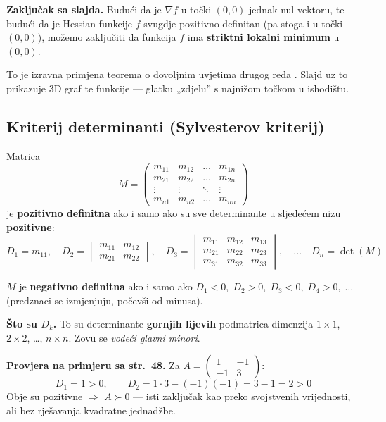 \textbf{Zaključak sa slajda.} Budući da je $\nabla f$ u točki $(0,0)$ jednak
nul-vektoru, te budući da je Hessian funkcije $f$ svugdje pozitivno definitan
(pa stoga i u točki $(0,0)$), možemo zaključiti da funkcija $f$ ima
\textbf{striktni lokalni minimum} u $(0,0)$.

To je izravna primjena teorema o dovoljnim uvjetima drugog reda .
Slajd uz to prikazuje 3D graf te funkcije --- glatku „zdjelu” s najnižom točkom
u ishodištu.

\subsection{Kriterij determinanti (Sylvesterov kriterij)}

\begin{teorem}
Matrica
\[
M = \begin{pmatrix}
m_{11} & m_{12} & \dots & m_{1n} \\
m_{21} & m_{22} & \dots & m_{2n} \\
\vdots & \vdots & \ddots & \vdots \\
m_{n1} & m_{n2} & \dots & m_{nn}
\end{pmatrix}
\]
je \textbf{pozitivno definitna} ako i samo ako su sve determinante u sljedećem
nizu \textbf{pozitivne}:
\[
D_1 = m_{11}, \quad
D_2 = \begin{vmatrix} m_{11} & m_{12} \\ m_{21} & m_{22}\end{vmatrix}, \quad
D_3 = \begin{vmatrix}
m_{11} & m_{12} & m_{13} \\
m_{21} & m_{22} & m_{23} \\
m_{31} & m_{32} & m_{33}\end{vmatrix}, \quad \dots \quad
D_n = \det(M)
\]

$M$ je \textbf{negativno definitna} ako i samo ako
$D_1 < 0,\; D_2 > 0,\; D_3 < 0,\; D_4 > 0,\; \dots$ (predznaci se izmjenjuju,
počevši od minusa).
\end{teorem}

\textbf{Što su $D_k$.} To su determinante \textbf{gornjih lijevih}
podmatrica dimenzija $1\times1$, $2\times2$, \dots, $n\times n$. Zovu se
\emph{vodeći glavni minori}.

\textbf{Provjera na primjeru sa str.\ 48.} Za
$A = \begin{pmatrix} 1 & -1 \\ -1 & 3\end{pmatrix}$:
\[
D_1 = 1 > 0, \qquad
D_2 = 1\cdot 3 - (-1)(-1) = 3 - 1 = 2 > 0
\]
Obje su pozitivne $\Rightarrow$ $A \succ 0$ --- isti zaključak kao preko
svojstvenih vrijednosti, ali bez rješavanja kvadratne jednadžbe. \checkmark

